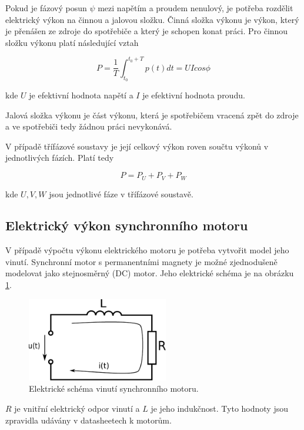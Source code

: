 Pokud je fázový posun $\psi$ mezi napětím a proudem nenulový, je potřeba rozdělit elektrický výkon na činnou a jalovou složku. Činná složka výkonu je výkon, který je přenášen ze zdroje do spotřebiče a který je schopen konat práci. Pro činnou složku výkonu platí následující vztah

\begin{equation}
P = \frac{1}{T} \int_{t_0}^{t_0 + T} p(t)dt = UI cos\phi
\label{act_power_eq}
\end{equation}  

kde $U$ je efektivní hodnota napětí a $I$ je efektivní hodnota proudu.

Jalová složka výkonu je část výkonu, která je spotřebičem vracená zpět do zdroje a ve spotřebiči tedy žádnou práci nevykonává.

V případě třífázové soustavy je její celkový výkon roven součtu výkonů v jednotlivých fázích. Platí tedy

\begin{equation}
P = P_U + P_V + P_W
\label{3ph_power_eq}
\end{equation}  

kde $U,V,W$ jsou jednotlivé fáze v třífázové soustavě.

\subsection{Elektrický výkon synchronního motoru}

V případě výpočtu výkonu elektrického motoru je potřeba vytvořit model jeho vinutí. Synchronní motor s permanentními magnety je možné zjednodušeně modelovat jako stejnosměrný (DC) motor. Jeho elektrické schéma je na obrázku \ref{schema_motoru_pic}.  

\begin{figure}[ht]
\includegraphics[width=0.55\textwidth]{obvod_motoru}
\caption{Elektrické schéma vinutí synchronního motoru.}
\label{schema_motoru_pic}
\end{figure}

$R$ je vnitřní elektrický odpor vinutí a $L$ je jeho indukčnost. Tyto hodnoty jsou zpravidla udávány v datasheetech k motorům.

